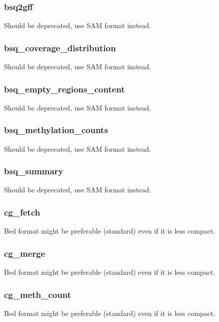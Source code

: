 \documentclass[a4paper,12pt]{article}
\begin{document}
\subsubsection{bsq2gff}

Should be deprecated, use SAM format instead.

\subsubsection{bsq\_coverage\_distribution}

Should be deprecated, use SAM format instead.

\subsubsection{bsq\_empty\_regions\_content}

Should be deprecated, use SAM format instead.

\subsubsection{bsq\_methylation\_counts}

Should be deprecated, use SAM format instead.

\subsubsection{bsq\_summary}

Should be deprecated, use SAM format instead.

\subsubsection{cg\_fetch}

Bed format might be preferable (standard) even if it is less compact.

\subsubsection{cg\_merge}

Bed format might be preferable (standard) even if it is less compact.

\subsubsection{cg\_meth\_count}

Bed format might be preferable (standard) even if it is less compact.
\end{document}

